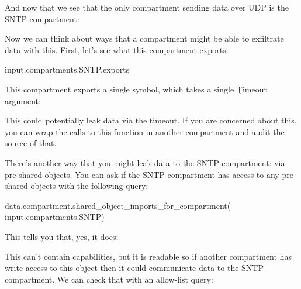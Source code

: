 And now that we see that the only compartment sending data over UDP is the SNTP compartment:

\begin{jsonsnippet}
[
  "SNTP"
]
\end{jsonsnippet}

Now we can think about ways that a compartment might be able to exfiltrate data with this.
First, let's see what this compartment exports:

\begin{regosnippet}
input.compartments.SNTP.exports
\end{regosnippet}

This compartment exports a single symbol, which takes a single \c{Timeout} argument:

\begin{jsonsnippet}
[
  {
    "export_symbol": "__export_SNTP__Z11sntp_updateP7Timeout",
    "exported": false,
    "interrupt_status": "enabled",
    "kind": "Function",
    "register_arguments": 1,
    "start_offset": 208
  \}
]
\end{jsonsnippet}

This could potentially leak data via the timeout.
If you are concerned about this, you can wrap the calls to this function in another compartment and audit the source of that.

There's another way that you might leak data to the SNTP compartment: via pre-shared objects.
You can ask if the SNTP compartment has access to any pre-shared objects with the following query:

\begin{regosnippet}
data.compartment.shared_object_imports_for_compartment(
	input.compartments.SNTP)
\end{regosnippet}

This tells you that, yes, it does:

\begin{jsonsnippet}
[
  {
    "kind": "SharedObject",
    "length": 24,
    "permits_load": true,
    "permits_load_mutable": false,
    "permits_load_store_capabilities": false,
    "permits_store": true,
    "shared_object": "sntp_time_at_last_sync",
    "start": 1237648
  \}
]
\end{jsonsnippet}

This can't contain capabilities, but it is readable so if another compartment has write access to this object then it could communicate data to the SNTP compartment.
We can check that with an allow-list query:

